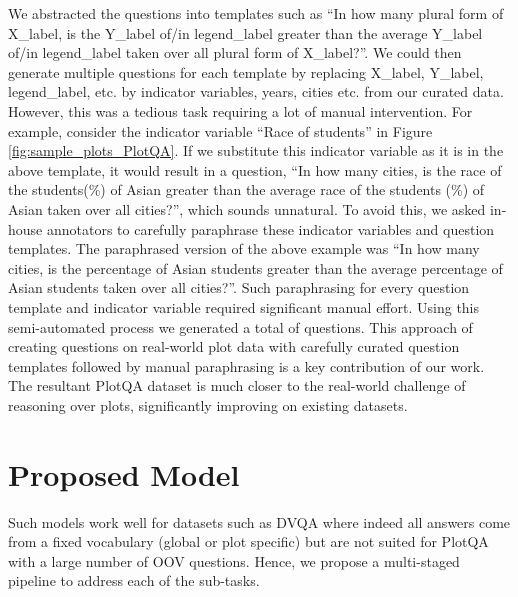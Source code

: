 \documentclass[10pt,twocolumn,letterpaper]{article}
\begin{document}
We abstracted the questions into templates such as ``In how many plural form of X\_label, is the Y\_label of/in legend\_label greater than the average Y\_label of/in legend\_label taken over all plural form of X\_label?''. We could then generate multiple questions for each template by replacing X\_label, Y\_label, legend\_label, etc. by indicator variables, years, cities etc. from our curated data. However, this was a tedious task requiring a lot of manual intervention. For example, consider the indicator variable ``Race of students'' in Figure \ref{fig:sample_plots_PlotQA}. 
If we substitute this indicator variable as it is in the above template, it would result in a question, ``In how many cities, is the race of the students(\%) of Asian greater than the average race of the students (\%) of Asian taken over all cities?'', which sounds unnatural. To avoid this, we asked in-house annotators to carefully paraphrase these indicator variables and question templates. The paraphrased version of the above example was ``In how many cities, is the percentage of Asian students greater than the average percentage of Asian students taken over all cities?''. Such paraphrasing for every question template and indicator variable required significant manual effort. Using this semi-automated process we generated a total of \revision{} questions. This approach of creating questions on real-world plot data with carefully curated question templates followed by manual paraphrasing is a key contribution of our work. 
The resultant PlotQA dataset is much closer to the real-world challenge of reasoning over plots, significantly improving on existing datasets.





\section{Proposed Model}
\label{sec:proposed_model}


 Such models work well for datasets such as DVQA where indeed all answers come from a fixed vocabulary (global or plot specific) but are not suited for PlotQA with a large number of OOV questions. 
Hence, we propose a multi-staged pipeline to address each of the sub-tasks.
\end{document}
